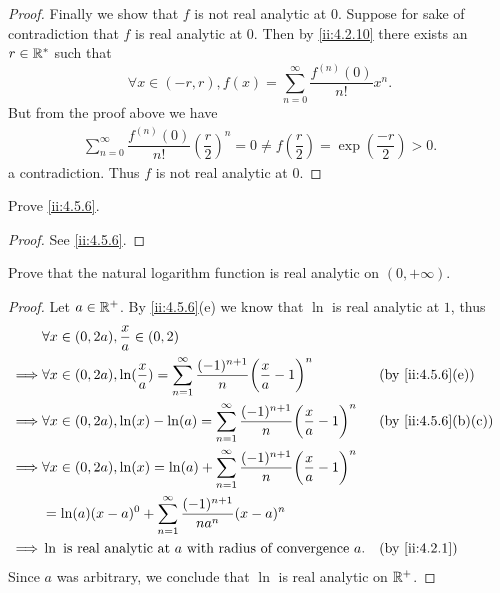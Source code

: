 \begin{proof}
  Finally we show that \(f\) is not real analytic at \(0\).
  Suppose for sake of contradiction that \(f\) is real analytic at \(0\).
  Then by \cref{ii:4.2.10} there exists an \(r \in \mathbb{R}^*\) such that
  \[
    \forall x \in (-r, r), f(x) = \sum_{n = 0}^\infty \dfrac{f^{(n)}(0)}{n!} x^n.
  \]
  But from the proof above we have
  \begin{align*}
    \sum_{n = 0}^\infty \dfrac{f^{(n)}(0)}{n!} (\dfrac{r}{2})^n = 0 \neq f(\dfrac{r}{2}) = \exp(\dfrac{-r}{2}) > 0.
  \end{align*}
  a contradiction.
  Thus \(f\) is not real analytic at \(0\).
\end{proof}

\begin{ex}\label{ii:ex:4.5.5}
  Prove \cref{ii:4.5.6}.
\end{ex}

\begin{proof}
  See \cref{ii:4.5.6}.
\end{proof}

\begin{ex}\label{ii:ex:4.5.6}
  Prove that the natural logarithm function is real analytic on \((0, +\infty)\).
\end{ex}

\begin{proof}
  Let \(a \in \mathbb{R}^+\).
  By \cref{ii:4.5.6}(e) we know that \(\ln\) is real analytic at \(1\), thus
  \begin{align*}
             & \forall x \in (0, 2a), \dfrac{x}{a} \in (0, 2)                                                                                                \\
    \implies & \forall x \in (0, 2a), \ln(\dfrac{x}{a}) = \sum_{n = 1}^\infty \dfrac{(-1)^{n + 1}}{n} \bigg(\dfrac{x}{a} - 1\bigg)^n &  & \by{ii:4.5.6}[e]   \\
    \implies & \forall x \in (0, 2a), \ln(x) - \ln(a) = \sum_{n = 1}^\infty \dfrac{(-1)^{n + 1}}{n} \bigg(\dfrac{x}{a} - 1\bigg)^n   &  & \by{ii:4.5.6}[b,c] \\
    \implies & \forall x \in (0, 2a), \ln(x) = \ln(a) + \sum_{n = 1}^\infty \dfrac{(-1)^{n + 1}}{n} \bigg(\dfrac{x}{a} - 1\bigg)^n                           \\
             & = \ln(a) (x - a)^0 + \sum_{n = 1}^\infty \dfrac{(-1)^{n + 1}}{n a^n} (x - a)^n                                                                \\
    \implies & \ln \text{ is real analytic at } a \text{ with radius of convergence } a.                                             &  & \by{ii:4.2.1}
  \end{align*}
  Since \(a\) was arbitrary, we conclude that \(\ln\) is real analytic on \(\mathbb{R}^+\).
\end{proof}


